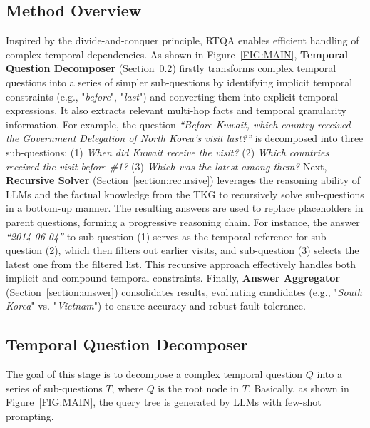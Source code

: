 \documentclass[11pt]{article}
\begin{document}
\subsection{Method Overview}
Inspired by the divide-and-conquer principle, RTQA enables efficient handling of complex temporal dependencies. As shown in Figure~\ref{FIG:MAIN}, \textbf{Temporal Question Decomposer} (Section~\ref{section:question decom}) firstly transforms complex temporal questions into a series of simpler sub-questions by identifying implicit temporal constraints (e.g., "\textit{before}", "\textit{last}") and converting them into explicit temporal expressions. It also extracts relevant multi-hop facts and temporal granularity information. For example, the question \textit{``Before Kuwait, which country received the Government Delegation of North Korea's visit last?''} is decomposed into three sub-questions: (1) \textit{When did Kuwait receive the visit?} (2) \textit{Which countries received the visit before \#1?} (3) \textit{Which was the latest among them?} 
Next, \textbf{Recursive Solver} (Section~\ref{section:recursive}) leverages the reasoning ability of LLMs and the factual knowledge from the TKG to recursively solve sub-questions in a bottom-up manner. The resulting answers are used to replace placeholders in parent questions, forming a progressive reasoning chain. For instance, the answer \textit{``2014-06-04''} to sub-question (1) serves as the temporal reference for sub-question (2), which then filters out earlier visits, and sub-question (3) selects the latest one from the filtered list. This recursive approach effectively handles both implicit and compound temporal constraints.
Finally, \textbf{Answer Aggregator} (Section~\ref{section:answer}) consolidates results, evaluating candidates (e.g., "\textit{South Korea}" vs. "\textit{Vietnam}") to ensure accuracy and robust fault tolerance.



\subsection{Temporal Question Decomposer}\label{section:question decom}
The goal of this stage is to decompose a complex temporal question \( Q \) into a series of sub-questions \( T \), where \( Q \) is the root node in \( T \). Basically, as shown in Figure~\ref{FIG:MAIN}, the query tree is generated by LLMs with few-shot prompting. 
\end{document}
